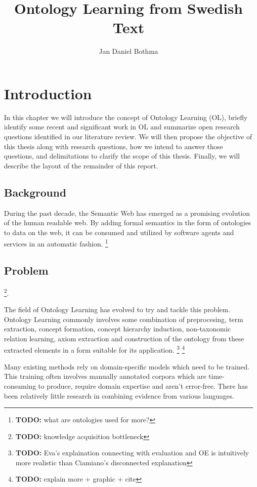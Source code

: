 \documentclass[a4paper]{report}
\title{Ontology Learning from Swedish Text}
\author{Jan Daniel Bothma}
\newcommand{\todo}[1]{\footnote{{\color{red} {\bf TODO:} #1}}}
\begin{document}
\maketitle

\abstract{}

\tableofcontents

\chapter{Introduction}

In this chapter we will introduce the concept of Ontology Learning (OL), briefly identify some recent and significant work in OL and summarize open research questions identified in our literature review.
We will then propose the objective of this thesis along with research questions, how we intend to answer those questions, and delimitations to clarify the scope of this thesis. Finally, we will describe the layout of the remainder of this report.

\section{Background}

During the past decade, the Semantic Web has emerged as a promising evolution of the human readable web. By adding formal semantics in the form of ontologies to data on the web, it can be consumed and utilized by software agents and services in an automatic fashion.
\todo{what are ontologies used for more?}

\section{Problem}

\todo{knowledge acquisition bottleneck}.

The field of Ontology Learning has evolved to try and tackle this problem.
Ontology Learning commonly involves some combination of preprocesing, term extraction, concept formation, concept hierarchy induction, non-taxonomic relation learning, axiom extraction and construction of the ontology from these extracted elements in a form suitable for its application.
\todo{Eva's explaination connecting with evaluation and OE is intuitively more realistic than Ciamiano's disconnected explanation}
\todo{explain more + graphic + cite}

Many existing methods rely on domain-specific models which need to be trained.
This training often involves manually annotated corpora which are time-consuming to produce, require domain expertise and aren't error-free.
There has been relatively little research in combining evidence from various languages.
\end{document}
